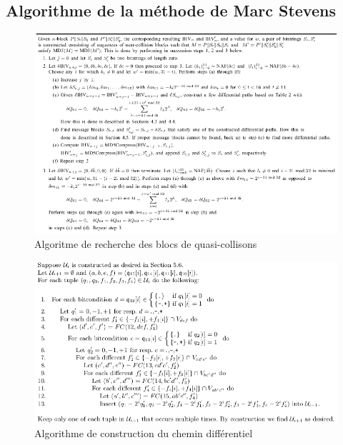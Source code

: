 \documentclass[a4paper,11pt,french]{article}
\begin{document}
\subsection{Algorithme de la méthode de Marc Stevens}
\begin{figure}[h!]
  \includegraphics[scale=.61]{./pics/ncb.png}
  \caption{Algoritme de recherche des blocs de quasi-collisons}
\end{figure}


\begin{figure}[h!]
  \includegraphics[scale=.50]{./pics/ui.png}
  \caption{Algorithme de construction du chemin différentiel}
\end{figure}
\end{document}

